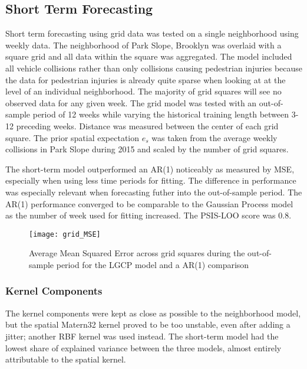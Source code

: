 \subsection{Short Term Forecasting}

Short term forecasting using grid data was tested on a single neighborhood using weekly data. The neighborhood of Park Slope, Brooklyn was overlaid with a square grid and all data within the square was aggregated. The model included all vehicle collisions rather than only collisions causing pedestrian injuries because the data for pedestrian injuries is already quite sparse when looking at at the level of an individual neighborhood. The majority of grid squares will see no observed data for any given week. The grid model was tested with an out-of-sample period of 12 weeks while varying the historical training length between 3-12 preceding weeks. Distance was measured between the center of each grid square. The prior spatial expectation $e_s$ was taken from the average weekly collisions in Park Slope during 2015 and scaled by the number of grid squares. \par

The short-term model outperformed an AR(1) noticeably as measured by MSE, especially when using less time periods for fitting. The difference in performance was especially relevant when forecasting futher into the out-of-sample period. The AR(1) performance converged to be comparable to the Gaussian Process model as the number of week used for fitting increased. The PSIS-LOO score was 0.8. \par

\begin{figure}[h!]
  \centering
  \caption{Average Mean Squared Error across grid squares during the out-of-sample period for the LGCP model and a AR(1) comparison}
  \texttt{[image: grid\_MSE]}
\end{figure}


\subsubsection{Kernel Components}

The kernel components were kept as close as possible to the neighborhood model, but the spatial Matern32 kernel proved to be too unstable, even after adding a jitter; another RBF kernel was used instead. The short-term model had the lowest share of explained variance between the three models, almost entirely attributable to the spatial kernel. \par

